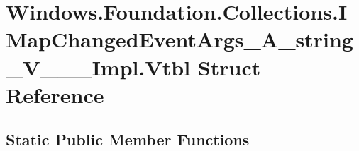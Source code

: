 \hypertarget{struct_windows_1_1_foundation_1_1_collections_1_1_i_map_changed_event_args___a__string___v_______impl_1_1_vtbl}{}\section{Windows.\+Foundation.\+Collections.\+I\+Map\+Changed\+Event\+Args\+\_\+\+A\+\_\+string\+\_\+\+V\+\_\+\+\_\+\+\_\+\+Impl.\+Vtbl Struct Reference}
\label{struct_windows_1_1_foundation_1_1_collections_1_1_i_map_changed_event_args___a__string___v_______impl_1_1_vtbl}
\subsection*{Static Public Member Functions}
